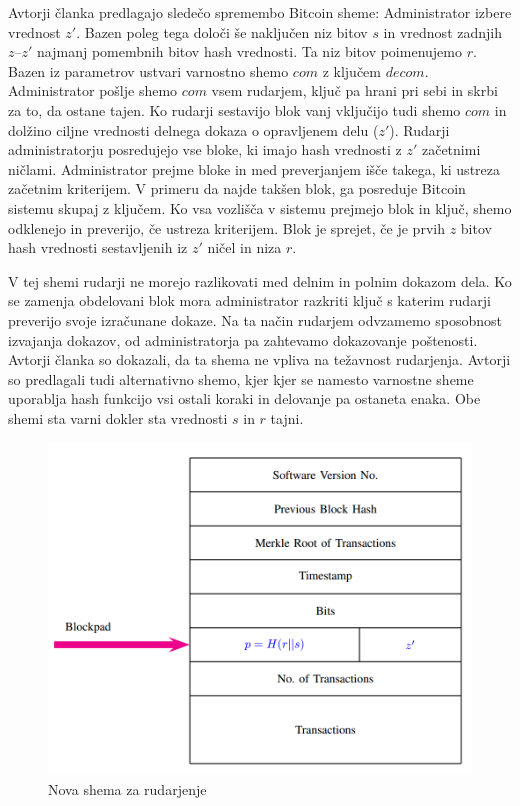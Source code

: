 \documentclass{acm_proc_article-sp}
\begin{document}
Avtorji članka predlagajo sledečo spremembo Bitcoin sheme:
Administrator izbere vrednost $z'$. Bazen poleg tega določi še naključen niz bitov $s$ in vrednost zadnjih $z – z'$ najmanj pomembnih bitov hash vrednosti. Ta niz bitov poimenujemo $r$.
Bazen iz parametrov ustvari varnostno shemo $com$ z ključem $decom$. Administrator pošlje shemo $com$ vsem rudarjem, ključ pa hrani pri sebi in skrbi za to, da ostane tajen. Ko rudarji sestavijo blok vanj vključijo tudi shemo $com$ in dolžino ciljne vrednosti delnega dokaza o opravljenem delu ($z'$). Rudarji administratorju posredujejo vse bloke, ki imajo hash vrednosti z $z'$ začetnimi ničlami. Administrator prejme bloke in med preverjanjem išče takega, ki ustreza začetnim kriterijem. V primeru da najde takšen blok, ga posreduje Bitcoin sistemu skupaj z ključem. Ko vsa vozlišča v sistemu prejmejo blok in ključ, shemo odklenejo in preverijo, če ustreza kriterijem. Blok je sprejet, če je prvih $z$ bitov hash vrednosti sestavljenih iz $z'$ ničel in niza $r$.
 
V tej shemi rudarji ne morejo razlikovati med delnim in polnim dokazom dela. Ko se zamenja obdelovani blok mora administrator razkriti ključ s katerim rudarji preverijo svoje izračunane dokaze. Na ta način rudarjem odvzamemo sposobnost izvajanja dokazov, od administratorja pa zahtevamo dokazovanje poštenosti. Avtorji članka so dokazali, da ta shema ne vpliva na težavnost rudarjenja. Avtorji so predlagali tudi alternativno shemo, kjer kjer se namesto varnostne sheme uporablja hash funkcijo vsi ostali koraki in delovanje pa ostaneta enaka. Obe shemi sta varni dokler sta vrednosti $s$ in $r$ tajni.

\begin{figure}
  \includegraphics[scale=0.30]{image10.png}
  \caption{Nova shema za rudarjenje}
  \label{fig:boat3}
\end{figure}
\end{document}
